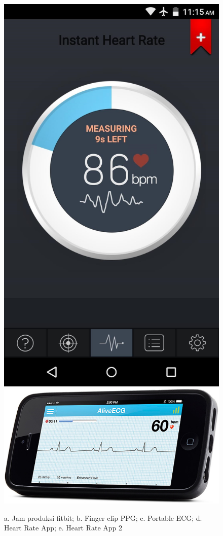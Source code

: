 \begin{figure}[H]
	\includegraphics[scale=0.05]{images/heart_app1.jpg}
	\includegraphics[scale=0.2]{images/heart_app2.jpg}
    \caption{a. Jam produksi fitbit; b. Finger clip PPG; c. Portable ECG; d. Heart Rate App; e. Heart Rate App 2}
\end{figure}

